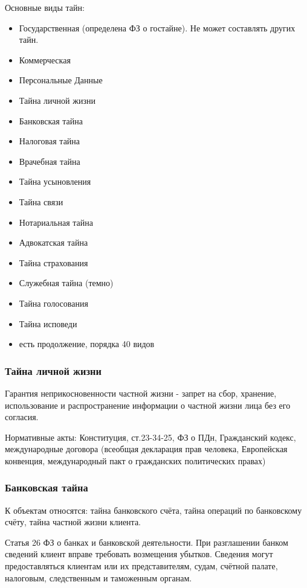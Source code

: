 \documentclass[a4paper,12pt]{report}
\begin{document}
	Основные виды тайн:
	\begin{itemize}
	\item	Государственная (определена ФЗ о гостайне). Не может составлять других тайн.
	\item	Коммерческая
	\item	Персональные Данные
	\item	Тайна личной жизни
	\item	Банковская тайна
	\item	Налоговая тайна
	\item	Врачебная тайна
	\item	Тайна усыновления
	\item	Тайна связи
	\item	Нотариальная тайна
	\item	Адвокатская тайна
	\item	Тайна страхования
	\item	Служебная тайна (темно)
	\item	Тайна голосования
	\item	Тайна исповеди
	\item	есть продолжение, порядка 40 видов
	\end{itemize}



	\subsubsection{Тайна личной жизни}
	Гарантия неприкосновенности частной жизни - запрет на сбор, хранение, использование и распространение информации о частной жизни лица без его согласия.

	Нормативные акты: Конституция, ст.23-34-25, ФЗ о ПДн, Гражданский кодекс, международные договора (всеобщая декларация прав человека, Европейская конвенция, международный пакт о гражданских политических правах)



	\subsubsection{Банковская тайна}
	К объектам относятся: тайна банковского счёта, тайна операций по банковскому счёту, тайна частной жизни клиента.

	Статья 26 ФЗ о банках и банковской деятельности. При разглашении банком сведений клиент вправе требовать возмещения убытков. Сведения могут предоставляться клиентам или их представителям, судам, счётной палате, налоговым, следственным и таможенным органам.
\end{document}
